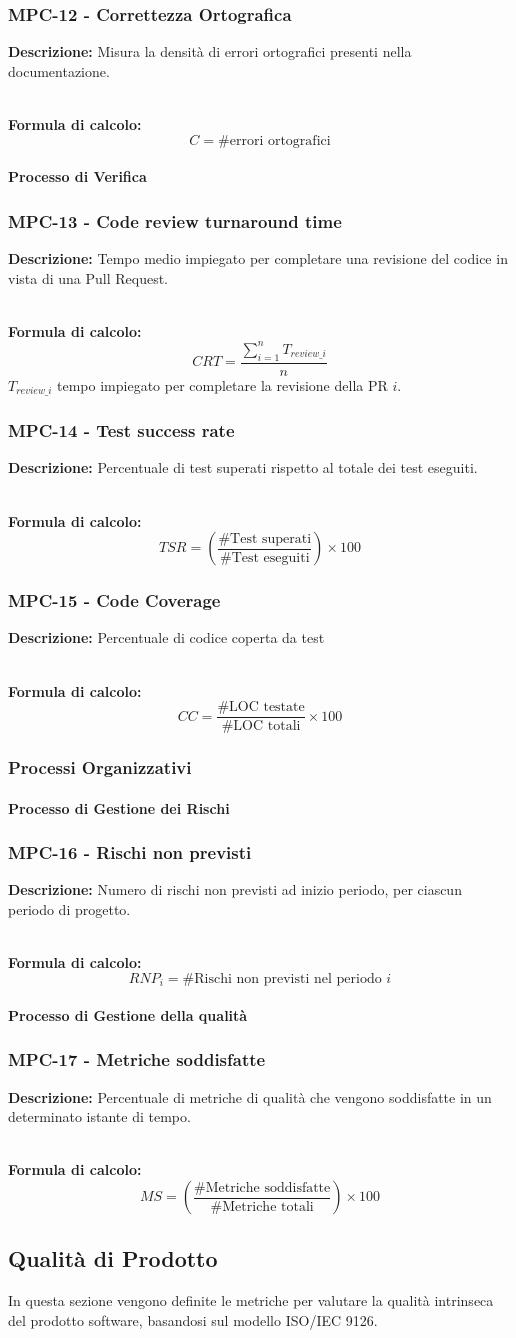 \documentclass[a4paper,12pt]{article}
\newcommand{\metricdef}[3]{
    \subsubsection*{#1 - #2}
    \textbf{Descrizione:} #3
}
\newcommand{\metricformula}[1]{
    \\[0.5em]
    \textbf{Formula di calcolo:}
    \begin{equation*}
        #1
    \end{equation*}
}
\begin{document}
\metricdef{MPC-12}{Correttezza Ortografica}{Misura la densità di errori ortografici presenti nella documentazione.}
\metricformula{C = \#\text{errori ortografici}}

\paragraph{Processo di Verifica}

\metricdef{MPC-13}{Code review turnaround time}{Tempo medio impiegato per completare una revisione del codice in vista di una Pull Request.}
\metricformula{CRT = \frac{\sum_{i=1}^{n} T_{review\_i}}{n}} $T_{review\_i}$ tempo impiegato per completare la revisione della PR $i$.

\metricdef{MPC-14}{Test success rate}{Percentuale di test superati rispetto al totale dei test eseguiti.}
\metricformula{TSR = \left( \frac{\#\text{Test superati}}{\#\text{Test eseguiti}} \right) \times 100}

\metricdef{MPC-15}{Code Coverage}{Percentuale di codice coperta da test}
\metricformula{CC = \frac{\#\text{LOC testate}}{\#\text{LOC totali}} \times 100}

\subsubsection{Processi Organizzativi}

\paragraph{Processo di Gestione dei Rischi} \label{gestione_rischi_operativi}

\metricdef{MPC-16}{Rischi non previsti}{Numero di rischi non previsti ad inizio periodo, per ciascun periodo di progetto.}
\metricformula{RNP_i = \#\text{Rischi non previsti nel periodo } i}

\paragraph{Processo di Gestione della qualità}

\metricdef{MPC-17}{Metriche soddisfatte}{Percentuale di metriche di qualità che vengono soddisfatte in un determinato istante di tempo.}
\metricformula{MS = \left( \frac{\#\text{Metriche soddisfatte}}{\#\text{Metriche totali}} \right) \times 100}

\subsection{Qualità di Prodotto} \label{qualita_prodotto}
In questa sezione vengono definite le metriche per valutare la qualità
intrinseca del prodotto software, basandosi sul modello ISO/IEC 9126.
\end{document}
